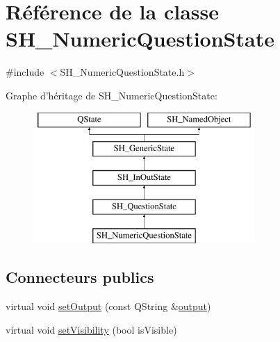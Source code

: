 \hypertarget{classSH__NumericQuestionState}{\section{Référence de la classe S\-H\-\_\-\-Numeric\-Question\-State}
\label{classSH__NumericQuestionState}
}


{\ttfamily \#include $<$S\-H\-\_\-\-Numeric\-Question\-State.\-h$>$}

Graphe d'héritage de S\-H\-\_\-\-Numeric\-Question\-State\-:\begin{figure}[H]
\begin{center}
\leavevmode
\includegraphics[height=5.000000cm]{classSH__NumericQuestionState}
\end{center}
\end{figure}
\subsection*{Connecteurs publics}
\begin{DoxyCompactItemize}
\item 
virtual void \hyperlink{classSH__InOutState_af611c84134e262739cd834797b315c80}{set\-Output} (const Q\-String \&\hyperlink{classSH__InOutState_a17ed7eaf5e3ed5af80a4f9fe65d5bfd9}{output})
\item 
virtual void \hyperlink{classSH__InOutState_a7fdfaa6f600f0ac4a96f238a038ba9ad}{set\-Visibility} (bool is\-Visible)
\end{DoxyCompactItemize}
